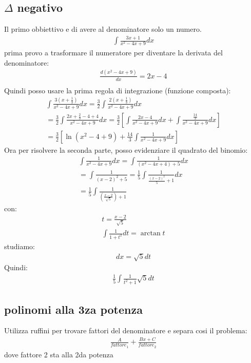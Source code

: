 \documentclass{article}
\begin{document}
\subsection{$\Delta$ negativo}
Il primo obbiettivo e di avere al denominatore solo un numero.
\begin{gather*}
		\int \frac{3x+1}{x^2-4x+9}dx
\end{gather*}
prima provo a trasformare il numeratore per diventare la derivata del denominatore:
\begin{gather*}
		\frac{d(x^2-4x+9)}{dx}=2x-4\\
\end{gather*}
Quindi posso usare la prima regola di integrazione (funzione composta):
\begin{gather*}
		\int \frac{3(x+\frac{1}{3})}{x^2-4x+9}dx=\frac{3}{2}\int \frac{2(x+\frac{1}{3})}{x^2-4x+9}dx\\
		=\frac{3}{2} \int \frac{2x+\frac{2}{3}-4+4}{x^2-4x+9}dx=\frac{3}{2}\left[ \int \frac{2x-4}{x^2-4x+9}dx+ \int \frac{\frac{14}{3}}{x^2-4x+9}dx\right]\\
		=\frac{3}{2}\left[ \ln (x^2-4+9)+\frac{14}{3}\int \frac{1}{x^2-4x+9}dx\right]
\end{gather*}
Ora per risolvere la seconda parte, posso evidenziare il quadrato del binomio:
\begin{gather*}
	\int \frac{1}{x^2-4x+9}dx = \int \frac{1}{(x^2-4x+4)+5}dx\\
	=\int \frac{1}{(x-2)^2+5}=\frac{1}{5}\int \frac{1}{\frac{(x-2)^2}{5}+1}dx\\
=\frac{1}{5} \int \frac{1}{\left( \frac{x-2}{\sqrt{5}}\right) + 1}
\end{gather*}
con:
\begin{gather*}
		t=\frac{x-2}{\sqrt{5}}\\
		\int \frac{1}{1+t^2}dt = \arctan t
\end{gather*}
studiamo:
\begin{gather*}
		dx=\sqrt{5}dt
\end{gather*}
Quindi:
\begin{gather*}
		\frac{1}{5}\int \frac{1}{t^2+1}\sqrt{5}dt
\end{gather*}
\subsection{polinomi alla 3za potenza}
Utilizza ruffini per trovare fattori del denominatore e separa cosi il problema:
\begin{gather*}
		\frac{A}{fattore_{1}}+\frac{Bx +C}{fattore_{2}}
\end{gather*}
dove fattore 2 sta alla 2da potenza
\end{document}
